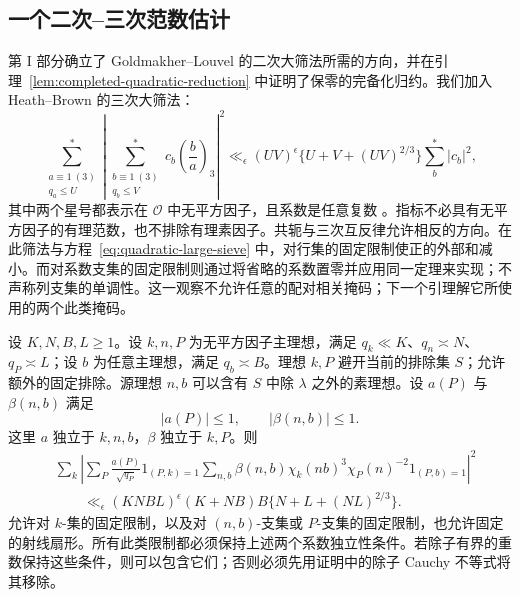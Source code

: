 \subsection{一个二次--三次范数估计}

第 I 部分确立了 Goldmakher--Louvel 的二次大筛法所需的方向，并在引理~\ref{lem:completed-quadratic-reduction} 中证明了保零的完备化归约。我们加入 Heath--Brown 的三次大筛法：
\begin{equation}\label{eq:cubic-large-sieve}
 \sum_{\substack{a\equiv1\ (3)\\q_a\le U}}^{*}
 \left|\sum_{\substack{b\equiv1\ (3)\\q_b\le V}}^{*}
           c_b\left(\frac ba\right)_3\right|^2
 \ll_\epsilon (UV)^\epsilon
       \{U+V+(UV)^{2/3}\}\sum_b^{*}|c_b|^2,
\end{equation}
其中两个星号都表示在 \(\mathcal O\) 中无平方因子，且系数是任意复数 \cite[定理 2]{HB}。指标不必具有无平方因子的有理范数，也不排除有理素因子。共轭与三次互反律允许相反的方向。在此筛法与方程~\eqref{eq:quadratic-large-sieve} 中，对行集的固定限制使正的外部和减小。而对系数支集的固定限制则通过将省略的系数置零并应用同一定理来实现；不声称列支集的单调性。这一观察不允许任意的配对相关掩码；下一个引理解它所使用的两个此类掩码。

\begin{lemma}\label{lem:hybrid-energy}
设 \(K,N,B,L\ge1\)。设 \(k,n,P\) 为无平方因子主理想，满足 \(q_k\ll K\)、\(q_n\asymp N\)、\(q_P\asymp L\)；设 \(b\) 为任意主理想，满足 \(q_b\asymp B\)。理想 \(k,P\) 避开当前的排除集 \(S\)；允许额外的固定排除。源理想 \(n,b\) 可以含有 \(S\) 中除 \(\lambda\) 之外的素理想。设 \(a(P)\) 与 \(\beta(n,b)\) 满足
\[
 |a(P)|\le1,\qquad |\beta(n,b)|\le1.
\]
这里 \(a\) 独立于 \(k,n,b\)，\(\beta\) 独立于 \(k,P\)。则
\begin{equation}\label{old-eq:4.6b}
 \begin{split}
 &\sum_k\left|
 \sum_P\frac{a(P)}{\sqrt{q_P}}1_{(P,k)=1}
 \sum_{n,b}\beta(n,b)\chi_k(nb)^3
                 \chi_P(n)^{-2}1_{(P,b)=1}
 \right|^2\\
 &\qquad\ll_\epsilon
 (KNBL)^\epsilon(K+NB)B\{N+L+(NL)^{2/3}\}.
 \end{split}
\end{equation}
允许对 \(k\)-集的固定限制，以及对 \((n,b)\)-支集或 \(P\)-支集的固定限制，也允许固定的射线扇形。所有此类限制都必须保持上述两个系数独立性条件。若除子有界的重数保持这些条件，则可以包含它们；否则必须先用证明中的除子 Cauchy 不等式将其移除。
\end{lemma}

